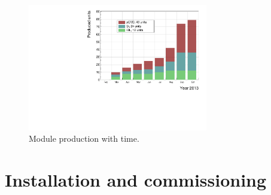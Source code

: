 \begin{figure}[!t]
\centering
\includegraphics[width=0.7\textwidth]{../scripts/04_charge_monitoring/plots/production1}
\caption{Module production with time.}
\label{fig:production}
\end{figure}



















\section{Installation and commissioning}
\label{sec:install}


